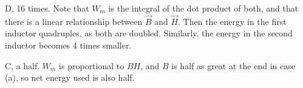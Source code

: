 \documentclass[answers]{exam}
\begin{document}
\begin{questions}
\begin{solution}
    D, 16 times. Note that $W_m$ is the integral of the dot product of both, and that there is a linear relationship between $\vec B$ and $\vec H$. Then the energy in the first inductor quadruples, as both are doubled. Similarly, the energy in the second inductor becomes 4 times smaller.
\end{solution}


\begin{solution}
    C, a half. $W_m$ is proportional to $BH$, and $B$ is half as great at the end in case (a), so net energy used is also half.
\end{solution}
\end{questions}
\end{document}
